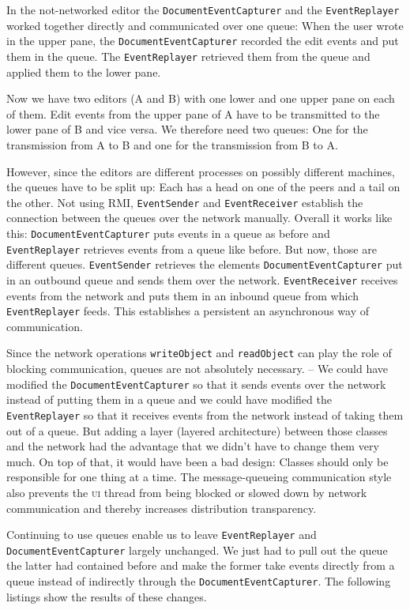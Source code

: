 \documentclass[a4paper,draft,12pt,oneside,article,table]{memoir}
\newcommand{\mil}[1]{\texttt{#1}}
\begin{document}
In the not-networked editor the \mil{DocumentEventCapturer} and the
\mil{EventReplayer} worked together directly and communicated over one
queue: When the user wrote in the upper pane, the
\mil{DocumentEventCapturer} recorded the edit events and put them in the
queue. The \mil{EventReplayer} retrieved them from the queue and applied
them to the lower pane.

Now we have two editors (A and B) with one lower and one upper pane on
each of them. Edit events from the upper pane of A have to be
transmitted to the lower pane of B and vice versa. We therefore need two
queues: One for the transmission from A to B and one for the
transmission from B to A.

However, since the editors are different processes on possibly different
machines, the queues have to be split up: Each has a head on one of the
peers and a tail on the other.  Not using RMI, \mil{EventSender} and
\mil{EventReceiver} establish the connection between the queues over the
network manually. Overall it works like this:
\mil{DocumentEventCapturer} puts events in a queue as before and
\mil{EventReplayer} retrieves events from a queue like before. But now,
those are different queues.  \mil{EventSender} retrieves the elements
\mil{DocumentEventCapturer} put in an outbound queue and sends them over
the network.  \mil{EventReceiver} receives events from the network and
puts them in an inbound queue from which \mil{EventReplayer} feeds. This
establishes a persistent an asynchronous way of communication.

Since the network operations \mil{writeObject} and \mil{readObject} can
play the role of blocking communication, queues are not absolutely
necessary. -- We could have modified the \mil{DocumentEventCapturer} so
that it sends events over the network instead of putting them in a queue
and we could have modified the \mil{EventReplayer} so that it receives
events from the network instead of taking them out of a queue. But
adding a layer (layered architecture) between those classes and the
network had the advantage that we didn't have to change them very much.
On top of that, it would have been a bad design: Classes should only be
responsible for one thing at a time. The message-queueing communication
style also prevents the \textsc{ui} thread from being blocked or slowed
down by network communication and thereby increases distribution
transparency.

Continuing to use queues enable us to leave \mil{EventReplayer} and
\mil{DocumentEventCapturer} largely unchanged. We just had to pull out
the queue the latter had contained before and make the former take
events directly from a queue instead of indirectly through the
\mil{DocumentEventCapturer}. The following listings show the results of
these changes.
\end{document}
